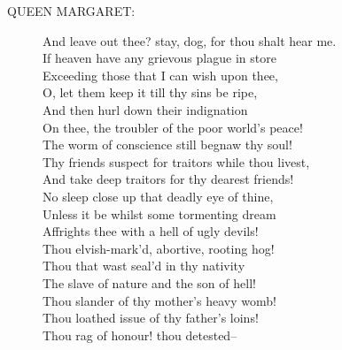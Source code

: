 \documentclass{article}
\begin{document}
\begin{description}
\item[QUEEN MARGARET:] 
\hspace{1pt}And leave out thee? stay, dog, for thou shalt hear me.\\
\hspace{1pt}If heaven have any grievous plague in store\\
\hspace{1pt}Exceeding those that I can wish upon thee,\\
\hspace{1pt}O, let them keep it till thy sins be ripe,\\
\hspace{1pt}And then hurl down their indignation\\
\hspace{1pt}On thee, the troubler of the poor world's peace!\\
\hspace{1pt}The worm of conscience still begnaw thy soul!\\
\hspace{1pt}Thy friends suspect for traitors while thou livest,\\
\hspace{1pt}And take deep traitors for thy dearest friends!\\
\hspace{1pt}No sleep close up that deadly eye of thine,\\
\hspace{1pt}Unless it be whilst some tormenting dream\\
\hspace{1pt}Affrights thee with a hell of ugly devils!\\
\hspace{1pt}Thou elvish-mark'd, abortive, rooting hog!\\
\hspace{1pt}Thou that wast seal'd in thy nativity\\
\hspace{1pt}The slave of nature and the son of hell!\\
\hspace{1pt}Thou slander of thy mother's heavy womb!\\
\hspace{1pt}Thou loathed issue of thy father's loins!\\
\hspace{1pt}Thou rag of honour! thou detested--\\
\end{description}
\end{document}
